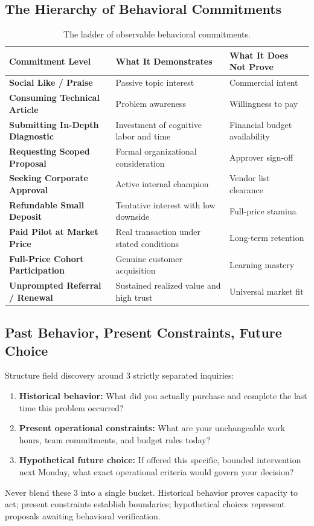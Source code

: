 \subsection{The Hierarchy of Behavioral Commitments}

\begin{table}[h]
\centering
\small
\begin{tabularx}{\columnwidth}{>{\RaggedRight\bfseries}p{2.3cm} >{\RaggedRight}X >{\RaggedRight}p{2.1cm}}
\toprule
Commitment Level & What It Demonstrates & What It Does Not Prove \\
\midrule
Social Like / Praise & Passive topic interest & Commercial intent \\
\addlinespace
Consuming Technical Article & Problem awareness & Willingness to pay \\
\addlinespace
Submitting In-Depth Diagnostic & Investment of cognitive labor and time & Financial budget availability \\
\addlinespace
Requesting Scoped Proposal & Formal organizational consideration & Approver sign-off \\
\addlinespace
Seeking Corporate Approval & Active internal champion & Vendor list clearance \\
\addlinespace
Refundable Small Deposit & Tentative interest with low downside & Full-price stamina \\
\addlinespace
Paid Pilot at Market Price & Real transaction under stated conditions & Long-term retention \\
\addlinespace
Full-Price Cohort Participation & Genuine customer acquisition & Learning mastery \\
\addlinespace
Unprompted Referral / Renewal & Sustained realized value and high trust & Universal market fit \\
\bottomrule
\end{tabularx}
\caption{The ladder of observable behavioral commitments.}
\label{tab:ch6_commitment_ladder}
\end{table}

\subsection{Past Behavior, Present Constraints, Future Choice}

Structure field discovery around 3 strictly separated inquiries:
\begin{enumerate}[leftmargin=1.2em,itemsep=0.2ex]
  \item \textbf{Historical behavior:} What did you actually purchase and complete the last time this problem occurred?
  \item \textbf{Present operational constraints:} What are your unchangeable work hours, team commitments, and budget rules today?
  \item \textbf{Hypothetical future choice:} If offered this specific, bounded intervention next Monday, what exact operational criteria would govern your decision?
\end{enumerate}
Never blend these 3 into a single bucket. Historical behavior proves capacity to act; present constraints establish boundaries; hypothetical choices represent proposals awaiting behavioral verification.

